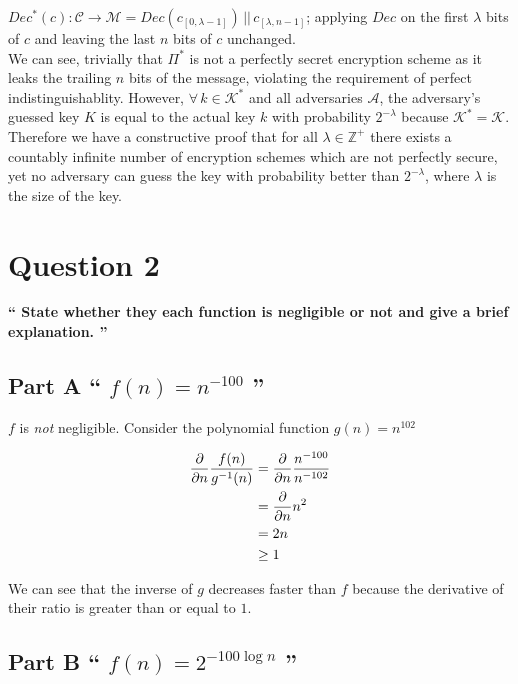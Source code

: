\documentclass{article}
\newcommand{\HomeworkText}[1]{\textbf{``#1''}\\}
\begin{document}
    $Dec^{*}(c) : \mathcal{C} \to \mathcal{M} = Dec(c_{[0,\lambda-1]}) \,||\, c_{[\lambda,n-1]}$; applying $Dec$ on the first $\lambda$ bits of $c$ and leaving the last $n$ bits of $c$ unchanged.\\
    
    We can see, trivially that $\Pi^{*}$ is not a perfectly secret encryption scheme as it leaks the trailing $n$ bits of the message, violating the requirement of perfect indistinguishablity. However, $\forall\, k \in \mathcal{K}^{*}$ and all adversaries $\mathcal{A}$, the adversary's guessed key $K$ is equal to the actual key $k$ with probability $2^{-\lambda}$ because $\mathcal{K}^{*} = \mathcal{K}$.    
    Therefore we have a constructive proof that for all $\lambda \in \mathbb{Z}^{+}$ there exists a countably infinite number of encryption schemes which are not perfectly secure, yet no adversary can guess the key with probability better than $2^{-\lambda}$, where $\lambda$ is the size of the key.


	\clearpage
	\section*{Question 2}
	\HomeworkText{
		State whether they each function is negligible or not and give a brief explanation.
	}

	\subsection*{Part A
	\HomeworkText{
		$f(n) = n^{-100}$
	}}

	$f$ is \emph{not} negligible. Consider the polynomial function $g(n) = n^{102}$
	
	\begin{equation}
	\begin{split}
	\pdv{}{n} \frac{f(n)}{g^{-1}(n)} & = \pdv{}{n} \frac{n^{-100}}{n^{-102}} \\
	  & = \pdv{}{n} n^2 \\
	  & = 2n \\
	  & \ge 1
	\end{split}
	\end{equation}
	
	We can see that the inverse of $g$ decreases faster than $f$ because the derivative of their ratio is greater than or equal to $1$.

	\subsection*{Part B
	\HomeworkText{
		$f(n) = 2^{-100 \log n}$
	}}
\end{document}
